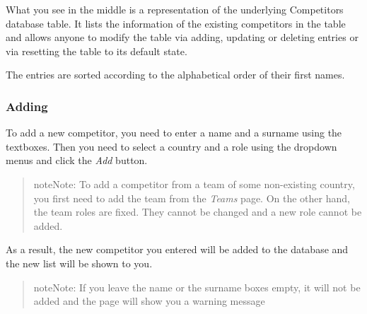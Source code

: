 \documentclass[a4paper,10pt,english]{sphinxmanual}
\begin{document}
What you see in the middle is a representation of the underlying Competitors database table. It lists the information of the existing competitors in the table and allows anyone to modify the table via adding, updating or deleting entries or via resetting the table to its default state.

The entries are sorted according to the alphabetical order of their first names.


\subsubsection{Adding}
\label{user/member4:adding}
To add a new competitor, you need to enter a name and a surname using the textboxes. Then you need to select a country and a role using the dropdown menus and click the \emph{Add} button.
\begin{quote}


\begin{notice}{note}{Note:}
To add a competitor from a team of some non-existing country, you first need to add the team from the \emph{Teams} page. On the other hand, the team roles are fixed. They cannot be changed and a new role cannot be added.
\end{notice}
\end{quote}

As a result, the new competitor you entered will be added to the database and the new list will be shown to you.
\begin{quote}


\begin{notice}{note}{Note:}
If you leave the name or the surname boxes empty, it will not be added and the page will show you a warning message
\end{notice}
\end{quote}
\end{document}
